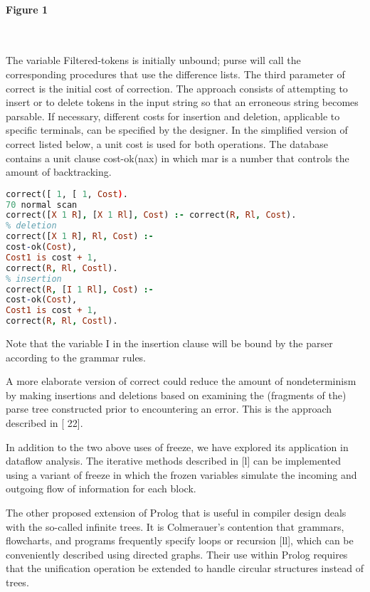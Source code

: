 \paragraph{Figure 1}\ \\\bigskip

The variable Filtered-tokens is initially unbound; purse will call the corresponding
procedures that use the difference lists. The third parameter of correct is the
initial cost of correction. The approach consists of attempting to insert or to
delete tokens in the input string so that an erroneous string becomes parsable. If
necessary, different costs for insertion and deletion, applicable to specific terminals,
can be specified by the designer. In the simplified version of correct listed
below, a unit cost is used for both operations. The database contains a unit clause
cost-ok(nax) in which mar is a number that controls the amount of backtracking. 
\begin{lstlisting}[language=prolog]
% final scan
correct([ 1, [ 1, Cost).
70 normal scan
correct([X 1 R], [X 1 Rl], Cost) :- correct(R, Rl, Cost).
% deletion
correct([X 1 R], Rl, Cost) :-
cost-ok(Cost),
Cost1 is cost + 1,
correct(R, Rl, Costl).
% insertion
correct(R, [I 1 Rl], Cost) :-
cost-ok(Cost),
Cost1 is cost + 1,
correct(R, Rl, Costl).
\end{lstlisting}
Note that the variable I in the insertion clause will be bound by the parser
according to the grammar rules. 

A more elaborate version of correct could reduce the amount of nondeterminism
by making insertions and deletions based on examining the (fragments of the) 
parse tree constructed prior to encountering an error. This is the approach
described in [ 22]. 

In addition to the two above uses of freeze, we have explored its application in
dataflow analysis. The iterative methods described in [l] can be implemented
using a variant of freeze in which the frozen variables simulate the incoming and
outgoing flow of information for each block. 

The other proposed extension of Prolog that is useful in compiler design deals
with the so-called infinite trees. It is Colmerauer’s contention that grammars,
flowcharts, and programs frequently specify loops or recursion [ll], which can
be conveniently described using directed graphs. Their use within Prolog requires
that the unification operation be extended to handle circular structures instead
of trees. 

